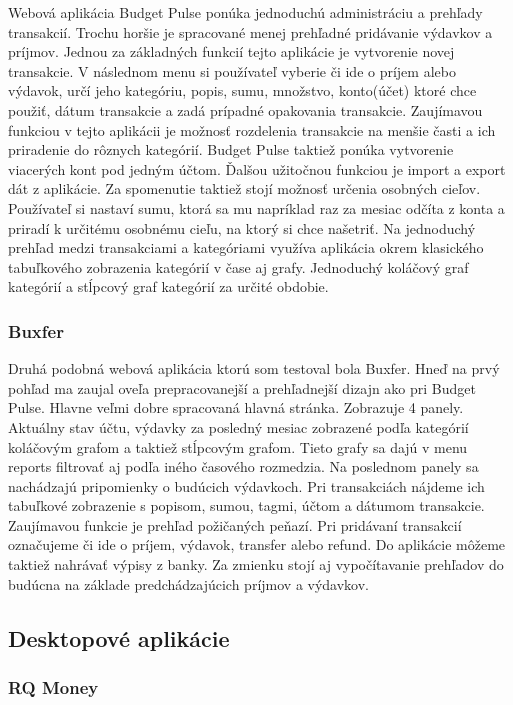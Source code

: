 \documentclass[12pt,oneside]{book}
\begin{document}
Webová aplikácia Budget Pulse ponúka jednoduchú administráciu a prehľady transakcií. Trochu horšie je spracované menej prehľadné pridávanie výdavkov a príjmov. Jednou za základných funkcií tejto aplikácie je vytvorenie novej transakcie. V následnom menu si používateľ vyberie či ide o príjem alebo výdavok, určí jeho kategóriu, popis, sumu, množstvo, konto(účet) ktoré chce použiť, dátum transakcie a zadá prípadné opakovania transakcie. Zaujímavou funkciou v tejto aplikácii je možnosť rozdelenia transakcie na menšie časti a ich priradenie do rôznych kategórií. Budget Pulse taktiež ponúka vytvorenie viacerých kont pod jedným účtom. Ďalšou užitočnou funkciou je import a export dát z aplikácie. Za spomenutie taktiež stojí možnosť určenia osobných cieľov. Používateľ si nastaví sumu, ktorá sa mu napríklad raz za mesiac odčíta z konta a priradí k určitému osobnému cieľu, na ktorý si chce našetriť. Na jednoduchý prehľad medzi transakciami a kategóriami využíva aplikácia okrem klasického tabuľkového zobrazenia kategórií v čase aj grafy. Jednoduchý koláčový graf kategórií a stĺpcový graf kategórií za určité obdobie.



\subsubsection{Buxfer \cite{Buxfer}\ }

Druhá podobná webová aplikácia ktorú som testoval bola Buxfer. Hneď na prvý pohľad ma zaujal oveľa prepracovanejší a prehľadnejší dizajn ako pri Budget Pulse. Hlavne veľmi dobre spracovaná hlavná stránka. Zobrazuje 4 panely. Aktuálny stav účtu, výdavky za posledný mesiac zobrazené podľa kategórií koláčovým grafom a taktiež stĺpcovým grafom. Tieto grafy sa dajú v menu reports filtrovať aj podľa iného časového rozmedzia. Na poslednom panely sa nachádzajú pripomienky o budúcich výdavkoch. Pri transakciách nájdeme ich tabuľkové zobrazenie s popisom, sumou, tagmi, účtom a dátumom transakcie. Zaujímavou funkcie je prehľad požičaných peňazí. Pri pridávaní transakcií označujeme či ide o príjem, výdavok, transfer alebo refund. Do aplikácie môžeme taktiež nahrávať výpisy z banky. Za zmienku stojí aj vypočítavanie prehľadov do budúcna na základe predchádzajúcich príjmov a výdavkov.


\subsection{Desktopové aplikácie}
\subsubsection{RQ Money \cite{RQMoney}\ }
\end{document}

